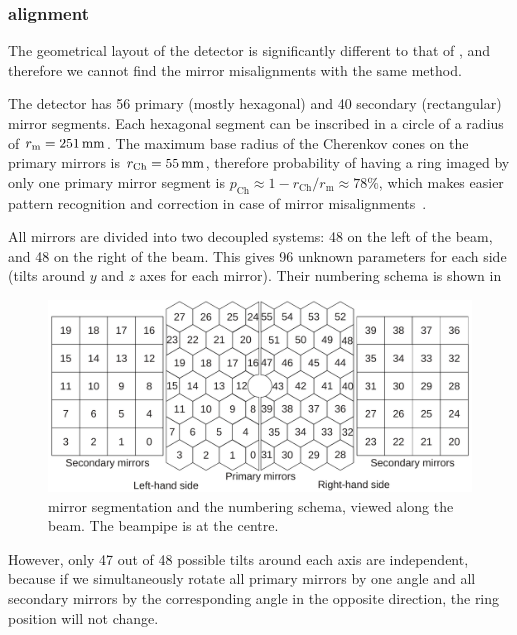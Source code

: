 \subsubsection{\richtwo alignment}

The geometrical layout of the \richtwo detector is significantly different to
that of \richone, and therefore we cannot find the mirror misalignments with
the same method.

The \richtwo detector has 56 primary (mostly hexagonal) and 40 secondary
(rectangular) mirror segments. Each hexagonal segment can be inscribed in a
circle of a radius of $r_{\mathrm{m}} = 251\rm \,mm$. The maximum base radius of the
Cherenkov cones on the primary mirrors is $r_{\mathrm{Ch}} = 55\rm \,mm$, therefore
probability of having a ring imaged by only one primary mirror segment is
$p_{\mathrm{Ch}} \approx 1 - r_{\mathrm{Ch}}/r_{\mathrm{m}} \approx 78\%$, which
makes easier pattern recognition and correction in case of mirror
misalignments~\cite{D'Ambrosio:2001ooa}.

All mirrors are divided into two decoupled systems: 48 on the left of the beam,
and 48 on the right of the beam. This gives 96 unknown parameters for each side
(tilts around $y$ and $z$ axes for each mirror). Their numbering schema is shown
in~
\begin{figure}[htbp]
  \vspace{-0.5\baselineskip}
  \centering
  \includegraphics[width=\textwidth]{figs/Method/RICH2_MirrorNumberingBothSides.pdf}
  \vspace{-1.0\baselineskip}
  \caption{
    \richtwo mirror segmentation and the numbering schema, viewed
    along the beam. The beampipe is at the centre.}
  \label{fig:RICH2_MirrorNumbering}
  \vspace{-0.5\baselineskip}
\end{figure}

However, only 47 out of 48 possible tilts around each axis are independent,
because if we simultaneously rotate all primary mirrors by one angle and all
secondary mirrors by the corresponding angle in the opposite direction, the ring
position will not change.

